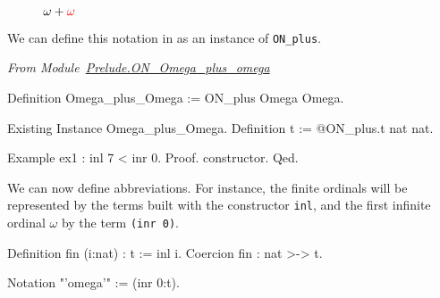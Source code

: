 \begin{figure}[h]
   \centering
   \caption{\textcolor{blue}{$\omega+{\color{red}\omega}$}}
   \label{fig:omega-plus-omega}
 \end{figure}

We can define this notation in \coq{} as an instance of \texttt{ON\_plus}.


\vspace{4pt}
\noindent\emph{From Module~\href{../src/html/hydras.Prelude.ON_Omega_plus_omega.html}{Prelude.ON\_Omega\_plus\_omega}}

\begin{Coqsrc}
Definition Omega_plus_Omega := ON_plus Omega Omega.

Existing Instance Omega_plus_Omega.
Definition t := @ON_plus.t nat nat.
\end{Coqsrc}

\begin{Coqsrc}
Example ex1 : inl 7 < inr 0.
Proof. constructor. Qed.
\end{Coqsrc}

We can now define abbreviations. For instance, the finite ordinals will be represented by the terms built with  the constructor \texttt{inl}, and the first infinite ordinal $\omega$ by the term \texttt{(inr 0)}.

\begin{Coqsrc}
Definition fin (i:nat) : t := inl i.
Coercion fin : nat >-> t.

Notation "'omega'" := (inr  0:t).
\end{Coqsrc}

